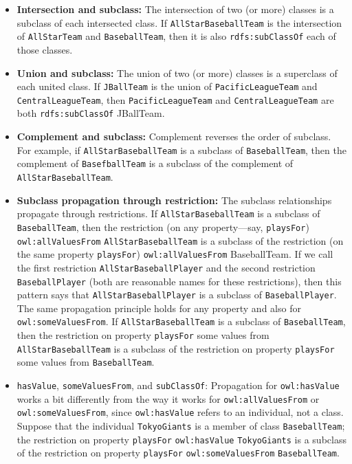 \begin{itemize}
\item \textbf{Intersection and subclass:} The intersection of two (or more) classes is
a subclass of each intersected class. If \texttt{AllStarBaseballTeam} is the
intersection of \texttt{AllStarTeam} and \texttt{BaseballTeam}, then it is also
\texttt{rdfs:subClassOf} each of those classes.

\item \textbf{Union and subclass:} The union of two (or more) classes is a superclass
of each united class.
If \texttt{JBallTeam} is the union of \texttt{PacificLeagueTeam} and \texttt{CentralLeagueTeam},
then \texttt{PacificLeagueTeam} and \texttt{CentralLeagueTeam} are both \texttt{rdfs:subClassOf}
JBallTeam.

\item \textbf{Complement and subclass:} Complement reverses the order of subclass. For
example, if \texttt{AllStarBaseballTeam} is a subclass of \texttt{BaseballTeam}, then the
complement of \texttt{BasefballTeam} is a subclass of the complement of
\texttt{AllStarBaseballTeam}.

\item \textbf{Subclass propagation through restriction:} The subclass relationships
propagate through
restrictions. If \texttt{AllStarBaseballTeam} is a subclass of \texttt{BaseballTeam}, then
the restriction (on any property---say, \texttt{playsFor}) \texttt{owl:allValuesFrom}
\texttt{AllStarBaseballTeam} is a subclass of the restriction (on the same
property \texttt{playsFor}) \texttt{owl:allValuesFrom} BaseballTeam. If we call the first
restriction \texttt{AllStarBaseballPlayer} and the second restriction
\texttt{BaseballPlayer} (both are reasonable names for these restrictions), then
this pattern says that \texttt{AllStarBaseballPlayer} is a subclass of
\texttt{BaseballPlayer}. The same propagation principle holds for any property
and also for \texttt{owl:someValuesFrom}. If
\texttt{AllStarBaseballTeam} is a subclass of \texttt{BaseballTeam}, then the restriction
on property \texttt{playsFor} some values from \texttt{AllStarBaseballTeam} is a subclass
of the restriction on property \texttt{playsFor} some values from \texttt{BaseballTeam}.

\item \texttt{hasValue}, \texttt{someValuesFrom}, and \texttt{subClassOf}: Propagation for \texttt{owl:hasValue}
works a bit differently from the way it works for \texttt{owl:allValuesFrom} or
\texttt{owl:someValuesFrom}, since \texttt{owl:hasValue} refers to an individual, not a
class. Suppose that the individual \texttt{TokyoGiants} is a member of class
\texttt{BaseballTeam}; the restriction on property \texttt{playsFor} \texttt{owl:hasValue}
\texttt{TokyoGiants} is a subclass of the restriction on property \texttt{playsFor}
\texttt{owl:someValuesFrom} \texttt{BaseballTeam}.


\end{itemize}
